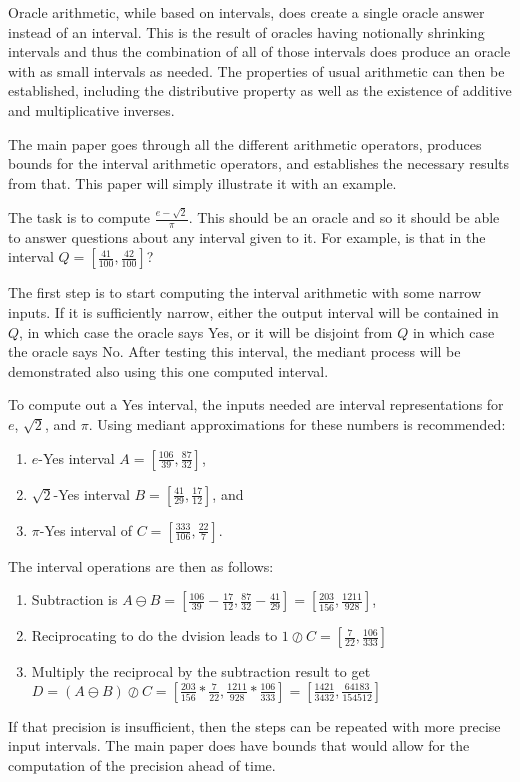 \documentclass[12pt]{article}
\theoremstyle{remark}
\begin{document}
Oracle arithmetic, while based on intervals, does create a single oracle answer instead of an interval. This is the result of oracles having notionally shrinking intervals and thus the combination of all of those intervals does produce an oracle with as small intervals as needed. The properties of usual arithmetic can then be established, including the distributive property as well as the existence of additive and multiplicative inverses.   

The main paper goes through all the different arithmetic operators, produces bounds for the interval arithmetic operators, and establishes the necessary results from that. This paper will simply illustrate it with an example. 

The task is to compute $\frac{e-\sqrt{2}}{\pi}$. This should be an oracle and so it should be able to answer questions about any interval given to it. For example, is that in the interval $Q = [\frac{41}{100}, \frac{42}{100}]$? 

The first step is to start computing the interval arithmetic with some narrow inputs. If it is sufficiently narrow, either the output interval will be contained in $Q$, in which case the oracle says Yes, or it will be disjoint from $Q$ in which case the oracle says No. After testing this interval, the mediant process will be demonstrated also using this one computed interval. 

To compute out a Yes interval, the inputs needed are interval representations for $e$, $\sqrt{2}$, and $\pi$. Using mediant approximations for these numbers is recommended: 
\begin{enumerate}
\item $e$-Yes interval $A  = [\frac{106}{39}, \frac{87}{32}]$,
\item $\sqrt{2}$-Yes interval $B = [\frac{41}{29}, \frac{17}{12}]$, and
\item $\pi$-Yes interval of $C= [\frac{333}{106}, \frac{22}{7}]$.
\end{enumerate}
The interval operations are then as follows:
\begin{enumerate}
\item Subtraction is $A\ominus B = [\frac{106}{39} - \frac{17}{12}, \frac{87}{32} - \frac{41}{29}] = [\frac{203}{156}, \frac{1211}{928}]$,
\item Reciprocating to do the dvision leads to  $1\oslash C = [\frac{7}{22}, \frac{106}{333}]$
\item Multiply the reciprocal by the subtraction result to get $D = (A\ominus B)\oslash C = [\frac{203}{156} *\frac{7}{22}, \frac{1211}{928} * \frac{106}{333}] = [\frac{1421}{3432}, \frac{64183}{154512}]$
\end{enumerate}
If that precision is insufficient, then the steps can be repeated with more precise input intervals. The main paper does have bounds that would allow for the computation of the precision ahead of time. 
\end{document}
